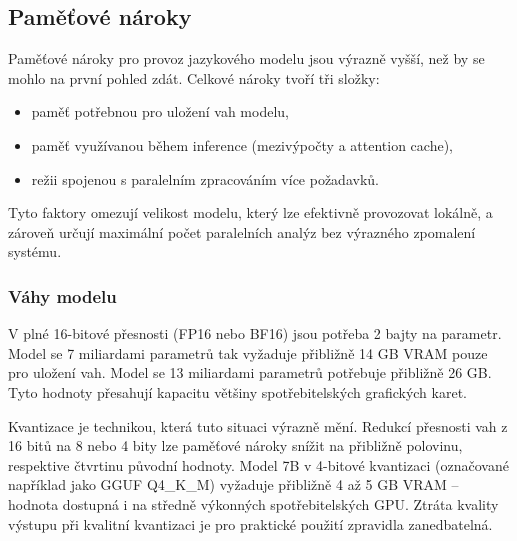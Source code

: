 \subsection{Paměťové nároky}
\label{subsec:llm-memory-requirements}

Paměťové nároky pro provoz jazykového modelu jsou výrazně vyšší, než by se mohlo na první pohled zdát.
Celkové nároky tvoří tři složky:

\begin{itemize}
    \item paměť potřebnou pro uložení vah modelu,
    \item paměť využívanou během inference (mezivýpočty a attention cache),
    \item režii spojenou s paralelním zpracováním více požadavků.
\end{itemize}

Tyto faktory omezují velikost modelu, který lze efektivně provozovat lokálně,
a zároveň určují maximální počet paralelních analýz bez výrazného zpomalení systému.

\subsubsection*{Váhy modelu}

V plné 16-bitové přesnosti (FP16 nebo BF16) jsou potřeba 2 bajty na parametr.
Model se 7 miliardami parametrů tak vyžaduje přibližně 14 GB VRAM pouze pro uložení vah.
Model se 13 miliardami parametrů potřebuje přibližně 26 GB.
Tyto hodnoty přesahují kapacitu většiny spotřebitelských grafických karet.

Kvantizace je technikou, která tuto situaci výrazně mění.
Redukcí přesnosti vah z 16 bitů na 8 nebo 4 bity lze paměťové nároky snížit na přibližně polovinu, respektive čtvrtinu původní hodnoty.
Model 7B v 4-bitové kvantizaci (označované například jako GGUF Q4\_K\_M) vyžaduje přibližně 4 až 5 GB VRAM -- hodnota dostupná i na středně výkonných spotřebitelských GPU.
Ztráta kvality výstupu při kvalitní kvantizaci je pro praktické použití zpravidla zanedbatelná.

\begin{table}[H]
    \centering
    \caption{Přibližné paměťové nároky modelů podle počtu parametrů a kvantizace (bez KV cache)}
    \label{tab:memory-requirements}
\end{table}

